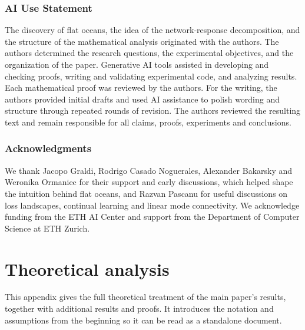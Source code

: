 \documentclass[twoside]{article}
\theoremstyle{remark}
\theoremstyle{highlightdefinition}
\theoremstyle{remark}
\begin{document}
\subsubsection*{AI Use Statement}
The discovery of flat oceans, the idea of the network-response decomposition, and the structure of the mathematical analysis originated with the authors. The authors determined the research questions, the experimental objectives, and the organization of the paper. Generative AI tools assisted in developing and checking proofs, writing and validating experimental code, and analyzing results. Each mathematical proof was reviewed by the authors. For the writing, the authors provided initial drafts and used AI assistance to polish wording and structure through repeated rounds of revision. The authors reviewed the resulting text and remain responsible for all claims, proofs, experiments and conclusions.

\subsubsection*{Acknowledgments}
We thank Jacopo Graldi, Rodrigo Casado Noguerales, Alexander Bakarsky and Weronika Ormaniec for their support and early discussions, which helped shape the intuition behind flat oceans, and Razvan Pascanu for useful discussions on loss landscapes, continual learning and linear mode connectivity. We acknowledge funding from the ETH AI Center and support from the Department of Computer Science at ETH Zurich.




\clearpage
\appendix
\onecolumn



\section{Theoretical analysis}
\label{app:proofs}

This appendix gives the full theoretical treatment of the main paper's results, together with additional results and proofs. It introduces the notation and assumptions from the beginning so it can be read as a standalone document.

\theoremstyle{plain}
\newtheorem*{appstatement}{\appstatementheading}
\newenvironment{restated}[1]{\def\appstatementheading{#1}\begin{appstatement}}{\end{appstatement}}
\newtheorem*{appconjecture}{Conjecture}
\theoremstyle{remark}
\newtheorem*{appremark}{\appstatementheading}
\newenvironment{restatedremark}[1]{\def\appstatementheading{#1}\begin{appremark}}{\end{appremark}}
\end{document}

